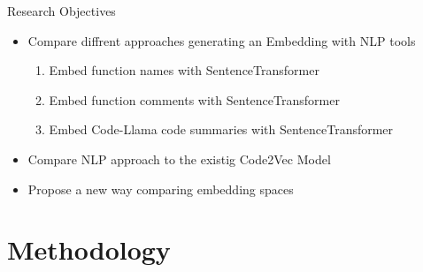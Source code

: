\documentclass[aspectratio=1610,12pt]{beamer}
\begin{document}
\begin{frame}[t]{Research Objectives}
  \begin{itemize}
    \item Compare diffrent approaches generating an Embedding with NLP tools
    \begin{enumerate}
      \item Embed function names with SentenceTransformer
      \item Embed function comments with SentenceTransformer
      \item Embed Code-Llama code summaries with SentenceTransformer
    \end{enumerate}
    \item Compare NLP approach to the existig Code2Vec Model
    \item Propose a new way comparing embedding spaces
  \end{itemize}
\end{frame}

\section{Methodology}
\end{document}
